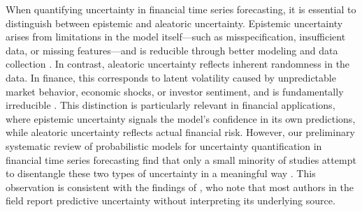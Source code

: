 When quantifying uncertainty in financial time series forecasting, it is essential to distinguish between epistemic and aleatoric uncertainty. Epistemic uncertainty arises from limitations in the model itself—such as misspecification, insufficient data, or missing features—and is reducible through better modeling and data collection \parencite{Hullermeier2021}. In contrast, aleatoric uncertainty reflects inherent randomness in the data. In finance, this corresponds to latent volatility caused by unpredictable market behavior, economic shocks, or investor sentiment, and is fundamentally irreducible \parencite{murphy_probai_2022}. This distinction is particularly relevant in financial applications, where epistemic uncertainty signals the model’s confidence in its own predictions, while aleatoric uncertainty reflects actual financial risk. However, our preliminary systematic review of probabilistic models for uncertainty quantification in financial time series forecasting find that only a small minority of studies attempt to disentangle these two types of uncertainty in a meaningful way \parencite{eggen2025probabilistic}. This observation is consistent with the findings of \textcite{Blasco2024}, who note that most authors in the field report predictive uncertainty without interpreting its underlying source. 

